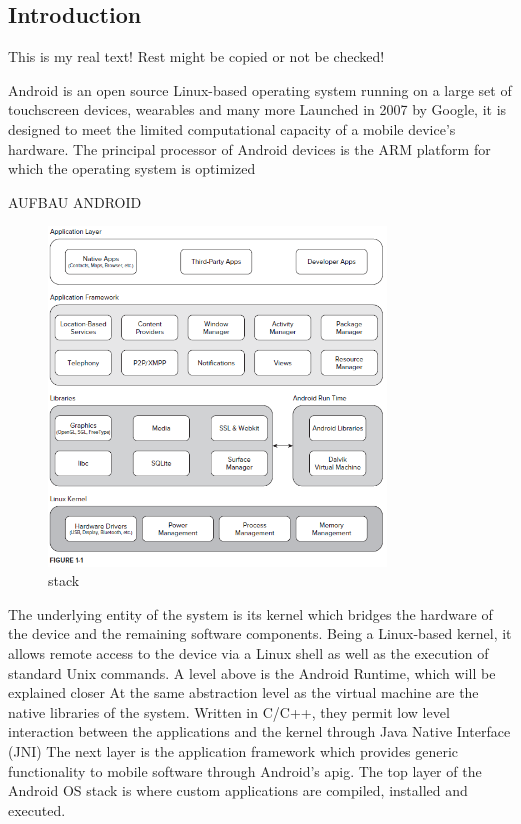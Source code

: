 \subsection{Introduction} \label{subsection:android-introduction}
This is my real text! Rest might be copied or not be checked!

%
Android is an open source Linux-based operating system running on a large set of touchscreen devices, wearables and many more\newline
Launched in 2007 by Google, it is designed to meet the limited computational capacity of a mobile device’s hardware. The principal processor of Android devices is the ARM platform for which the operating system is optimized\newline

AUFBAU ANDROID
\begin{figure}[h]
    \centering
    \includegraphics[width=0.8\textwidth]{data/stack.png}
    \caption{stack}
    \label{fig:stack}
\end{figure}
The underlying entity of the system is its kernel which bridges the hardware of the device and the remaining software components. Being a Linux-based kernel, it allows remote access to the device via a Linux shell as well as the execution of standard Unix commands.\newline
A level above is the Android Runtime, which will be explained closer\newline
At the same abstraction level as the virtual machine are the native libraries of the system. Written in C/C++, they permit low level interaction between the applications and the kernel through Java Native Interface (JNI)\newline
The next layer is the application framework which provides generic functionality to mobile software through Android’s  \gls{apig}.
The top layer of the Android OS stack is where custom applications are compiled, installed and executed.\newline
\cite{kovachevaMaster}
%


